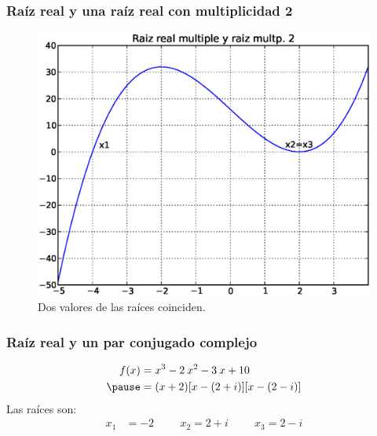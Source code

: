 \documentclass[12pt]{beamer}
\begin{document}
\begin{frame}[fragile]
\frametitle{Raíz real y una raíz real con multiplicidad 2}
\begin{figure}
	\centering
	\includegraphics[scale=0.4]{Imagenes/raices03.eps} 
	\caption{Dos valores de las raíces coinciden.}
\end{figure}
\end{frame}
\begin{frame}[fragile]
\frametitle{Raíz real y un par conjugado complejo}
\begin{eqnarray*}
\begin{aligned}
f (x) &= x^{3} - 2 \: x^{2} - 3 \: x + 10  \\  \pause
&= (x + 2) [x - (2 + i)] [x - (2 - i)]
\end{aligned}
\end{eqnarray*}
Las raíces son:
\pause
\begin{align*}
x_{1} &= -2 \hspace{1cm} x_{2} = 2 + i \hspace{1cm} x_{3} = 2 - i
\end{align*}
\end{frame}
\end{document}
